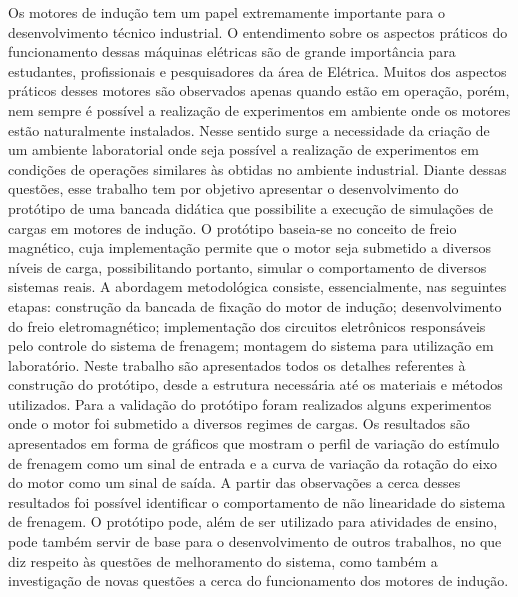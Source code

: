 Os motores de indução tem um papel extremamente importante para o desenvolvimento técnico industrial. O entendimento sobre os aspectos práticos do funcionamento dessas máquinas elétricas são de grande importância para estudantes, profissionais e pesquisadores da área de Elétrica. Muitos dos aspectos práticos desses motores são observados apenas quando estão em operação, porém, nem sempre é possível a realização de experimentos em ambiente onde os motores estão naturalmente instalados. Nesse sentido surge a necessidade da criação de um ambiente laboratorial onde seja possível a realização de experimentos em condições de operações similares às obtidas no ambiente industrial. Diante dessas questões, esse trabalho tem por objetivo apresentar o desenvolvimento do protótipo de uma bancada didática que possibilite a execução de simulações de cargas em motores de indução. O protótipo baseia-se no conceito de freio magnético, cuja implementação permite que o motor seja submetido a diversos níveis de carga, possibilitando portanto, simular o comportamento de diversos sistemas reais. A abordagem metodológica consiste, essencialmente, nas seguintes etapas: construção da bancada de fixação do motor de indução; desenvolvimento do freio eletromagnético; implementação dos circuitos eletrônicos responsáveis pelo controle do sistema de frenagem; montagem do sistema para utilização em laboratório. Neste trabalho são apresentados todos os detalhes referentes à construção do protótipo, desde a estrutura necessária até os materiais e métodos utilizados. Para a validação do protótipo foram realizados alguns experimentos onde o motor foi submetido a diversos regimes de cargas. Os resultados são apresentados em forma de gráficos que mostram o perfil de variação do estímulo de frenagem como um sinal de entrada e a curva de variação da rotação do eixo do motor como um sinal de saída. A partir das observações a cerca desses resultados foi possível identificar o comportamento de não linearidade do sistema de frenagem. O protótipo pode, além de ser utilizado para atividades de ensino, pode também servir de base para o desenvolvimento de outros trabalhos, no que diz respeito às questões de melhoramento do sistema, como também a investigação de novas questões a cerca do funcionamento dos motores de indução.

